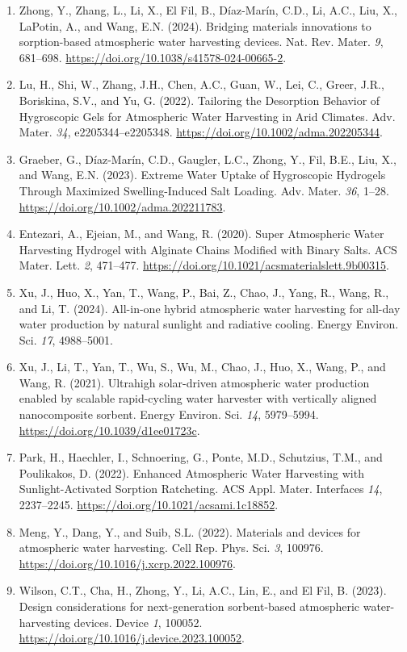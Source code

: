 \documentclass[11pt]{article}
\begin{document}
\begin{enumerate}[leftmargin=2em,itemsep=0.25em]
\item Zhong, Y., Zhang, L., Li, X., El Fil, B., Díaz-Marín, C.D., Li, A.C., Liu, X., LaPotin, A., and Wang, E.N. (2024). Bridging materials innovations to sorption-based atmospheric water harvesting devices. Nat. Rev. Mater. \textit{9}, 681--698. \url{https://doi.org/10.1038/s41578-024-00665-2}.
\item Lu, H., Shi, W., Zhang, J.H., Chen, A.C., Guan, W., Lei, C., Greer, J.R., Boriskina, S.V., and Yu, G. (2022). Tailoring the Desorption Behavior of Hygroscopic Gels for Atmospheric Water Harvesting in Arid Climates. Adv. Mater. \textit{34}, e2205344--e2205348. \url{https://doi.org/10.1002/adma.202205344}.
\item Graeber, G., Díaz-Marín, C.D., Gaugler, L.C., Zhong, Y., Fil, B.E., Liu, X., and Wang, E.N. (2023). Extreme Water Uptake of Hygroscopic Hydrogels Through Maximized Swelling-Induced Salt Loading. Adv. Mater. \textit{36}, 1--28. \url{https://doi.org/10.1002/adma.202211783}.
\item Entezari, A., Ejeian, M., and Wang, R. (2020). Super Atmospheric Water Harvesting Hydrogel with Alginate Chains Modified with Binary Salts. ACS Mater. Lett. \textit{2}, 471--477. \url{https://doi.org/10.1021/acsmaterialslett.9b00315}.
\item Xu, J., Huo, X., Yan, T., Wang, P., Bai, Z., Chao, J., Yang, R., Wang, R., and Li, T. (2024). All-in-one hybrid atmospheric water harvesting for all-day water production by natural sunlight and radiative cooling. Energy Environ. Sci. \textit{17}, 4988--5001.
\item Xu, J., Li, T., Yan, T., Wu, S., Wu, M., Chao, J., Huo, X., Wang, P., and Wang, R. (2021). Ultrahigh solar-driven atmospheric water production enabled by scalable rapid-cycling water harvester with vertically aligned nanocomposite sorbent. Energy Environ. Sci. \textit{14}, 5979--5994. \url{https://doi.org/10.1039/d1ee01723c}.
\item Park, H., Haechler, I., Schnoering, G., Ponte, M.D., Schutzius, T.M., and Poulikakos, D. (2022). Enhanced Atmospheric Water Harvesting with Sunlight-Activated Sorption Ratcheting. ACS Appl. Mater. Interfaces \textit{14}, 2237--2245. \url{https://doi.org/10.1021/acsami.1c18852}.
\item Meng, Y., Dang, Y., and Suib, S.L. (2022). Materials and devices for atmospheric water harvesting. Cell Rep. Phys. Sci. \textit{3}, 100976. \url{https://doi.org/10.1016/j.xcrp.2022.100976}.
\item Wilson, C.T., Cha, H., Zhong, Y., Li, A.C., Lin, E., and El Fil, B. (2023). Design considerations for next-generation sorbent-based atmospheric water-harvesting devices. Device \textit{1}, 100052. \url{https://doi.org/10.1016/j.device.2023.100052}.

\end{enumerate}
\end{document}
